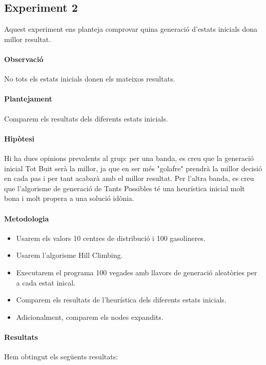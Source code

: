 \documentclass[a4paper]{article}
\begin{document}
\subsection{Experiment 2}
Aquest experiment ens planteja comprovar quina generació d'estats inicials dona millor resultat.
\paragraph{Observació} No tots els estats inicials donen els mateixos resultats.
\paragraph{Plantejament} Comparem els resultats dels diferents estats inicials.
\paragraph{Hipòtesi} Hi ha dues opinions prevalents al grup: per una banda, es creu que la generació inicial Tot Buit serà la millor, ja que en ser més "golafre" prendrà la millor decisió en cada pas i per tant acabarà amb el millor resultat. Per l'altra banda, es creu que l'algorisme de generació de Tants Possibles té una heurística inicial molt bona i molt propera a una solució idònia.
\paragraph{Metodologia}
\begin{itemize}
\item Usarem els valors 10 centres de distribució i 100 gasolineres.
\item Usarem l'algorisme Hill Climbing.
\item Executarem el programa 100 vegades amb llavors de generació aleatòries per a cada estat inical.
\item Comparem els resultats de l'heurística dels diferents estats inicials.
\item Adicionalment, comparem els nodes expandits.
\end{itemize}

\paragraph{Resultats} Hem obtingut els següents resultats:
\end{document}
